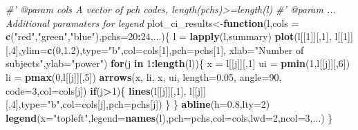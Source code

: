 \documentclass[]{article}
\newenvironment{Shaded}{\begin{snugshade}}{\end{snugshade}}
\newcommand{\KeywordTok}[1]{\textcolor[rgb]{0.13,0.29,0.53}{\textbf{#1}}}
\newcommand{\DataTypeTok}[1]{\textcolor[rgb]{0.13,0.29,0.53}{#1}}
\newcommand{\DecValTok}[1]{\textcolor[rgb]{0.00,0.00,0.81}{#1}}
\newcommand{\FloatTok}[1]{\textcolor[rgb]{0.00,0.00,0.81}{#1}}
\newcommand{\StringTok}[1]{\textcolor[rgb]{0.31,0.60,0.02}{#1}}
\newcommand{\CommentTok}[1]{\textcolor[rgb]{0.56,0.35,0.01}{\textit{#1}}}
\newcommand{\ControlFlowTok}[1]{\textcolor[rgb]{0.13,0.29,0.53}{\textbf{#1}}}
\newcommand{\OperatorTok}[1]{\textcolor[rgb]{0.81,0.36,0.00}{\textbf{#1}}}
\newcommand{\NormalTok}[1]{#1}
\begin{document}
\begin{Shaded}
\begin{Highlighting}[]
\CommentTok{#'  @param cols A vector of pch codes, length(pchs)>=length(l)}
\CommentTok{#'  @param ... Additional paramaters for legend}
\NormalTok{plot_ci_results<-}\ControlFlowTok{function}\NormalTok{(l,}\DataTypeTok{cols =} \KeywordTok{c}\NormalTok{(}\StringTok{"red"}\NormalTok{,}\StringTok{"green"}\NormalTok{,}\StringTok{"blue"}\NormalTok{),}\DataTypeTok{pchs=}\DecValTok{20}\OperatorTok{:}\DecValTok{24}\NormalTok{,...)\{}
\NormalTok{  l =}\StringTok{ }\KeywordTok{lapply}\NormalTok{(l,summary)}
  \KeywordTok{plot}\NormalTok{(l[[}\DecValTok{1}\NormalTok{]][,}\DecValTok{1}\NormalTok{], l[[}\DecValTok{1}\NormalTok{]][,}\DecValTok{4}\NormalTok{],}\DataTypeTok{ylim=}\KeywordTok{c}\NormalTok{(}\DecValTok{0}\NormalTok{,}\FloatTok{1.2}\NormalTok{),}\DataTypeTok{type=}\StringTok{"b"}\NormalTok{,}\DataTypeTok{col=}\NormalTok{cols[}\DecValTok{1}\NormalTok{],}\DataTypeTok{pch=}\NormalTok{pchs[}\DecValTok{1}\NormalTok{],}
       \DataTypeTok{xlab=}\StringTok{"Number of subjects"}\NormalTok{,}\DataTypeTok{ylab=}\StringTok{"power"}\NormalTok{)}
  \ControlFlowTok{for}\NormalTok{(j }\ControlFlowTok{in} \DecValTok{1}\OperatorTok{:}\KeywordTok{length}\NormalTok{(l))\{}
\NormalTok{    x =}\StringTok{ }\NormalTok{l[[j]][,}\DecValTok{1}\NormalTok{]}
\NormalTok{    ui =}\StringTok{ }\KeywordTok{pmin}\NormalTok{(}\DecValTok{1}\NormalTok{,l[[j]][,}\DecValTok{6}\NormalTok{])}
\NormalTok{    li =}\StringTok{ }\KeywordTok{pmax}\NormalTok{(}\DecValTok{0}\NormalTok{,l[[j]][,}\DecValTok{5}\NormalTok{])}
    \KeywordTok{arrows}\NormalTok{(x, li, x, ui, }\DataTypeTok{length=}\FloatTok{0.05}\NormalTok{, }\DataTypeTok{angle=}\DecValTok{90}\NormalTok{, }\DataTypeTok{code=}\DecValTok{3}\NormalTok{,}\DataTypeTok{col=}\NormalTok{cols[j])  }
    \ControlFlowTok{if}\NormalTok{(j}\OperatorTok{>}\DecValTok{1}\NormalTok{)\{}
      \KeywordTok{lines}\NormalTok{(l[[j]][,}\DecValTok{1}\NormalTok{], l[[j]][,}\DecValTok{4}\NormalTok{],}\DataTypeTok{type=}\StringTok{"b"}\NormalTok{,}\DataTypeTok{col=}\NormalTok{cols[j],}\DataTypeTok{pch=}\NormalTok{pchs[j])}
\NormalTok{    \}}
\NormalTok{  \}}
  \KeywordTok{abline}\NormalTok{(}\DataTypeTok{h=}\FloatTok{0.8}\NormalTok{,}\DataTypeTok{lty=}\DecValTok{2}\NormalTok{)}
  \KeywordTok{legend}\NormalTok{(}\DataTypeTok{x=}\StringTok{"topleft"}\NormalTok{,}\DataTypeTok{legend=}\KeywordTok{names}\NormalTok{(l),}\DataTypeTok{pch=}\NormalTok{pchs,}\DataTypeTok{col=}\NormalTok{cols,}\DataTypeTok{lwd=}\DecValTok{2}\NormalTok{,}\DataTypeTok{ncol=}\DecValTok{3}\NormalTok{,...)}
\NormalTok{\}}
\end{Highlighting}
\end{Shaded}
\end{document}
